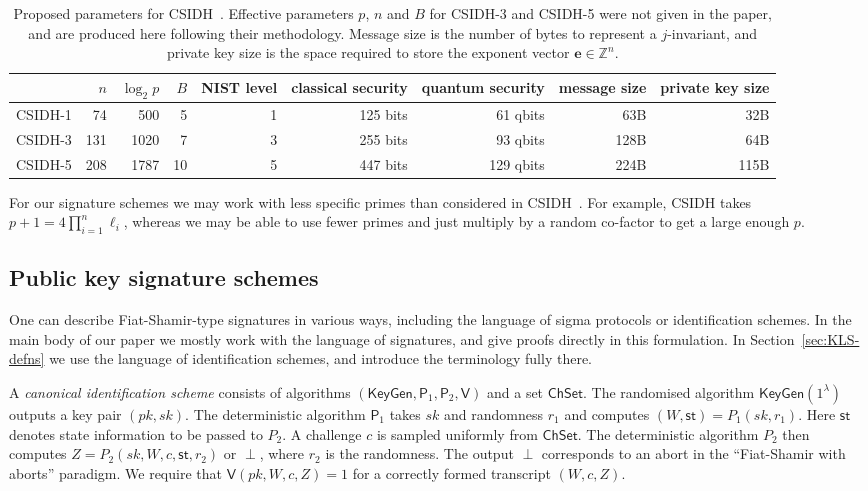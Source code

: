 \documentclass{llncs}
\newcommand{\Z}{\mathbb{Z}}
\newcommand{\e}{\mathbf{e}}
\newcommand{\KeyGen}{\mathsf{KeyGen}}
\newcommand{\PP}{\mathsf{P}}
\newcommand{\VV}{\mathsf{V}}
\newcommand{\ChSet}{\textsf{ChSet}}
\newcommand{\St}{\textsf{st}}
\begin{document}
\begin{table}
  \centering
  \begin{tabular}{l | r | r | r | r | r | r | r | r}
    & $n$ & $\log_2 p$ & $B$ & NIST level & classical security & quantum security & message size & private key size \\
    \hline
    CSIDH-1 &  74 &  500 &  5 & 1 & 125 bits &  61 qbits &  63B &  32B\\
    CSIDH-3 & 131 & 1020 &  7 & 3 & 255 bits &  93 qbits & 128B &  64B\\
    CSIDH-5 & 208 & 1787 & 10 & 5 & 447 bits & 129 qbits & 224B & 115B
  \end{tabular}
  \caption{Proposed parameters for CSIDH~\cite{CLMPR18}.  Effective
    parameters $p$, $n$ and $B$ for CSIDH-3 and CSIDH-5 were not given
    in the paper, and are produced here following their methodology.
    Message size is the number of bytes to represent a $j$-invariant, and private key size is the space required to store the exponent vector $\e \in \Z^n$.}
  \label{tab:csidh-parms}
\end{table}




For our signature schemes we may work with less specific primes than considered in CSIDH~\cite{CLMPR18}. For example, CSIDH takes $p+1 = 4\prod_{i=1}^n\ell_i$, whereas we may be able to use fewer primes and just multiply by a random co-factor to get a large enough $p$.




\subsection{Public key signature schemes}

One can describe Fiat-Shamir-type signatures in various ways, including the language of sigma protocols or identification schemes.
In the main body of our paper we mostly work with the language of signatures, and give proofs directly in this formulation.
In Section~\ref{sec:KLS-defns} we use the language of identification schemes, and introduce the terminology fully there.

A \emph{canonical identification scheme} consists of algorithms $(\KeyGen, \PP_1, \PP_2, \VV)$ and a set $\ChSet$. The randomised algorithm $\KeyGen( 1^\lambda )$ outputs a key pair $(pk,sk)$.
The deterministic algorithm $\PP_1$ takes $sk$ and randomness $r_1$ and computes $(W, \St) = P_1( sk, r_1 )$. 
Here $\St$ denotes state information to be passed to $P_2$.
A challenge $c$ is sampled uniformly from $\ChSet$. The deterministic algorithm $P_2$ then computes $Z = P_2( sk, W, c, \St, r_2 )$ or $\perp$, where $r_2$ is the randomness.
The output $\perp$ corresponds to an abort in the ``Fiat-Shamir with aborts'' paradigm.
We require that $\VV( pk, W, c, Z ) = 1$ for a correctly formed transcript $(W,c,Z)$.
\end{document}
